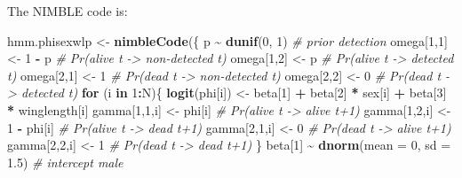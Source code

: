 \documentclass[
  12pt,
]{krantz}
\newenvironment{Shaded}{\begin{snugshade}}{\end{snugshade}}
\newcommand{\AttributeTok}[1]{\textcolor[rgb]{0.13,0.29,0.53}{#1}}
\newcommand{\CommentTok}[1]{\textcolor[rgb]{0.56,0.35,0.01}{\textit{#1}}}
\newcommand{\ControlFlowTok}[1]{\textcolor[rgb]{0.13,0.29,0.53}{\textbf{#1}}}
\newcommand{\DecValTok}[1]{\textcolor[rgb]{0.00,0.00,0.81}{#1}}
\newcommand{\FloatTok}[1]{\textcolor[rgb]{0.00,0.00,0.81}{#1}}
\newcommand{\FunctionTok}[1]{\textcolor[rgb]{0.13,0.29,0.53}{\textbf{#1}}}
\newcommand{\NormalTok}[1]{#1}
\newcommand{\OtherTok}[1]{\textcolor[rgb]{0.56,0.35,0.01}{#1}}
\newcommand{\SpecialCharTok}[1]{\textcolor[rgb]{0.81,0.36,0.00}{\textbf{#1}}}
\begin{document}
The NIMBLE code is:

\begin{Shaded}
\begin{Highlighting}[]
\NormalTok{hmm.phisexwlp }\OtherTok{\textless{}{-}} \FunctionTok{nimbleCode}\NormalTok{(\{}
\NormalTok{  p }\SpecialCharTok{\textasciitilde{}} \FunctionTok{dunif}\NormalTok{(}\DecValTok{0}\NormalTok{, }\DecValTok{1}\NormalTok{)               }\CommentTok{\# prior detection}
\NormalTok{  omega[}\DecValTok{1}\NormalTok{,}\DecValTok{1}\NormalTok{] }\OtherTok{\textless{}{-}} \DecValTok{1} \SpecialCharTok{{-}}\NormalTok{ p           }\CommentTok{\# Pr(alive t {-}\textgreater{} non{-}detected t)}
\NormalTok{  omega[}\DecValTok{1}\NormalTok{,}\DecValTok{2}\NormalTok{] }\OtherTok{\textless{}{-}}\NormalTok{ p               }\CommentTok{\# Pr(alive t {-}\textgreater{} detected t)}
\NormalTok{  omega[}\DecValTok{2}\NormalTok{,}\DecValTok{1}\NormalTok{] }\OtherTok{\textless{}{-}} \DecValTok{1}               \CommentTok{\# Pr(dead t {-}\textgreater{} non{-}detected t)}
\NormalTok{  omega[}\DecValTok{2}\NormalTok{,}\DecValTok{2}\NormalTok{] }\OtherTok{\textless{}{-}} \DecValTok{0}               \CommentTok{\# Pr(dead t {-}\textgreater{} detected t)}
  \ControlFlowTok{for}\NormalTok{ (i }\ControlFlowTok{in} \DecValTok{1}\SpecialCharTok{:}\NormalTok{N)\{}
    \FunctionTok{logit}\NormalTok{(phi[i]) }\OtherTok{\textless{}{-}}\NormalTok{ beta[}\DecValTok{1}\NormalTok{] }\SpecialCharTok{+}\NormalTok{ beta[}\DecValTok{2}\NormalTok{] }\SpecialCharTok{*}\NormalTok{ sex[i] }\SpecialCharTok{+}\NormalTok{ beta[}\DecValTok{3}\NormalTok{] }\SpecialCharTok{*}\NormalTok{ winglength[i]}
\NormalTok{    gamma[}\DecValTok{1}\NormalTok{,}\DecValTok{1}\NormalTok{,i] }\OtherTok{\textless{}{-}}\NormalTok{ phi[i]      }\CommentTok{\# Pr(alive t {-}\textgreater{} alive t+1)}
\NormalTok{    gamma[}\DecValTok{1}\NormalTok{,}\DecValTok{2}\NormalTok{,i] }\OtherTok{\textless{}{-}} \DecValTok{1} \SpecialCharTok{{-}}\NormalTok{ phi[i]  }\CommentTok{\# Pr(alive t {-}\textgreater{} dead t+1)}
\NormalTok{    gamma[}\DecValTok{2}\NormalTok{,}\DecValTok{1}\NormalTok{,i] }\OtherTok{\textless{}{-}} \DecValTok{0}           \CommentTok{\# Pr(dead t {-}\textgreater{} alive t+1)}
\NormalTok{    gamma[}\DecValTok{2}\NormalTok{,}\DecValTok{2}\NormalTok{,i] }\OtherTok{\textless{}{-}} \DecValTok{1}           \CommentTok{\# Pr(dead t {-}\textgreater{} dead t+1)}
\NormalTok{  \}}
\NormalTok{  beta[}\DecValTok{1}\NormalTok{] }\SpecialCharTok{\textasciitilde{}} \FunctionTok{dnorm}\NormalTok{(}\AttributeTok{mean =} \DecValTok{0}\NormalTok{, }\AttributeTok{sd =} \FloatTok{1.5}\NormalTok{) }\CommentTok{\# intercept male}

\end{Highlighting}
\end{Shaded}
\end{document}
